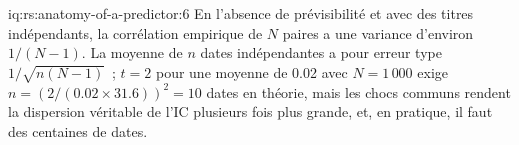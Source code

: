 \begin{solution}{iq:rs:anatomy-of-a-predictor:6}
En l'absence de prévisibilité et avec des titres indépendants, la corrélation empirique de $N$ paires a une variance d'environ $1/(N - 1)$. La moyenne de $n$
dates indépendantes a pour erreur type $1/\sqrt{n(N - 1)}$~; $t = 2$ pour une moyenne de 0.02 avec $N = 1\,000$ exige $n = (2/(0.02 \times
31.6))^2 = 10$ dates en théorie, mais les chocs communs rendent la dispersion véritable de l'IC plusieurs fois plus grande, et, en pratique, il faut des centaines de
dates.
\end{solution}
